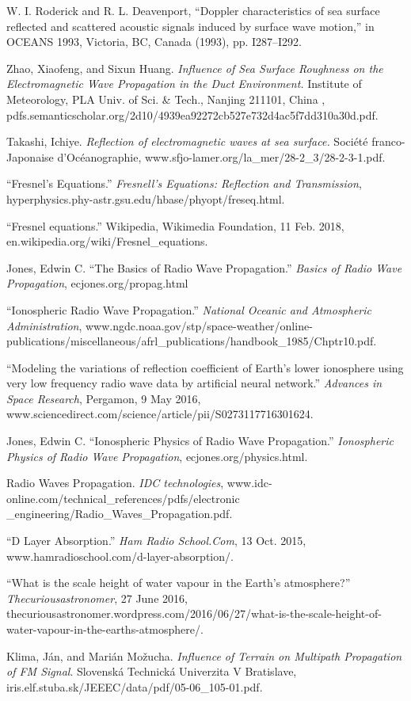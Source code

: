 \documentclass{article}
\begin{document}
\newpage
\begin{thebibliography}{9}
W. I. Roderick and R. L. Deavenport, “Doppler characteristics of sea surface reflected and scattered acoustic signals induced by surface wave motion,” in OCEANS 1993, Victoria, BC, Canada (1993), pp. I287–I292.

Zhao, Xiaofeng, and Sixun Huang. \textit{Influence of Sea Surface Roughness on the Electromagnetic Wave Propagation in the Duct Environment.} Institute of Meteorology, PLA Univ. of Sci. & Tech., Nanjing 211101, China , pdfs.semanticscholar.org/2d10/4939ea92272cb527e732d4ac5f7dd310a30d.pdf.

Takashi, Ichiye. \textit{Reflection of electromagnetic waves at sea surface.} Société franco-Japonaise d'Océanographie, www.sfjo-lamer.org/la\_mer/28-2\_3/28-2-3-1.pdf.

“Fresnel's Equations.” \textit{Fresnell's Equations: Reflection and Transmission}, hyperphysics.phy-astr.gsu.edu/hbase/phyopt/freseq.html. 


“Fresnel equations.” Wikipedia, Wikimedia Foundation, 11 Feb. 2018, en.wikipedia.org/wiki/Fresnel\_equations. 

Jones, Edwin C. “The Basics of Radio Wave Propagation.” \textit{Basics of Radio Wave Propagation}, ecjones.org/propag.html

“Ionospheric Radio Wave Propagation.” \textit{National Oceanic and Atmospheric Administration}, www.ngdc.noaa.gov/stp/space-weather/online-publications/miscellaneous/afrl\_publications/handbook\_1985/Chptr10.pdf.

“Modeling the variations of reflection coefficient of Earth's lower ionosphere using very low frequency radio wave data by artificial neural network.” \textit{Advances in Space Research}, Pergamon, 9 May 2016, www.sciencedirect.com/science/article/pii/S0273117716301624.

Jones, Edwin C. “Ionospheric Physics of Radio Wave Propagation.” \textit{Ionospheric Physics of Radio Wave Propagation}, ecjones.org/physics.html.

Radio Waves Propagation. \textit{IDC technologies}, www.idc-online.com/technical\_references/pdfs/electronic \_engineering/Radio\_Waves\_Propagation.pdf.

“D Layer Absorption.” \textit{Ham Radio School.Com}, 13 Oct. 2015, www.hamradioschool.com/d-layer-absorption/.

“What is the scale height of water vapour in the Earth's atmosphere?” \textit{Thecuriousastronomer}, 27 June 2016, thecuriousastronomer.wordpress.com/2016/06/27/what-is-the-scale-height-of-water-vapour-in-the-earths-atmosphere/. 

Klima, Ján, and Marián Možucha. \textit{Influence of Terrain on Multipath Propagation of FM Signal}. Slovenská Technická Univerzita V Bratislave, iris.elf.stuba.sk/JEEEC/data/pdf/05-06\_105-01.pdf.

\end{thebibliography}
\end{document}
